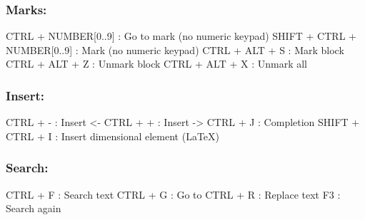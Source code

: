 \subsubsection{Marks:}

\vspace{-0.5cm}
\begin{Rtables}[caption={[Marks menu keyboard shortcuts]
    Marks menu keyboard shortcuts},
  label=menu:marks]
  CTRL  + NUMBER[0..9]        : Go to mark (no numeric keypad)
  SHIFT + CTRL + NUMBER[0..9] : Mark (no numeric keypad)
  CTRL  + ALT  + S            : Mark block
  CTRL  + ALT  + Z            : Unmark block
  CTRL  + ALT  + X            : Unmark all
\end{Rtables}


\subsubsection{Insert:}

\vspace{-0.5cm}
\begin{Rtables}[caption={[Insert menu keyboard shortcuts]
    Insert menu keyboard shortcuts},
  label=menu:insert]
  CTRL + -               : Insert <-
  CTRL + +               : Insert ->
  CTRL + J               : Completion
  SHIFT + CTRL + I       : Insert dimensional element (LaTeX)
\end{Rtables}


\subsubsection{Search:}

\vspace{-0.5cm}
\begin{Rtables}[caption={[Search menu keyboard shortcuts]
    Search menu keyboard shortcuts},
  label=menu:search]
  CTRL + F                : Search text
  CTRL + G                : Go to
  CTRL + R                : Replace text
  F3                      : Search again
\end{Rtables}


